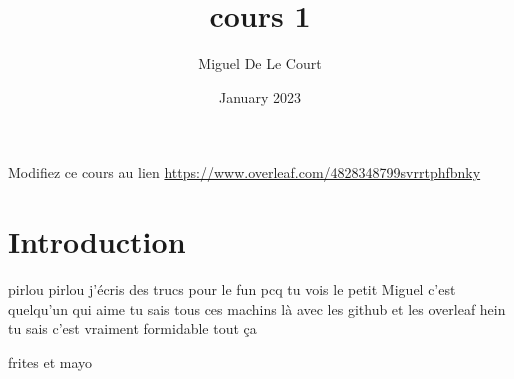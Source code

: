 \documentclass{article}
\title{cours 1}
\author{Miguel De Le Court}
\date{January 2023}
\begin{document}
\maketitle
Modifiez ce cours au lien \url{https://www.overleaf.com/4828348799svrrtphfbnky}

\section{Introduction}


pirlou pirlou j'écris des trucs pour le fun pcq tu vois le petit Miguel c'est quelqu'un qui aime tu sais tous ces machins là avec les github et les overleaf hein tu sais c'est vraiment formidable tout ça

frites et mayo
\end{document}

